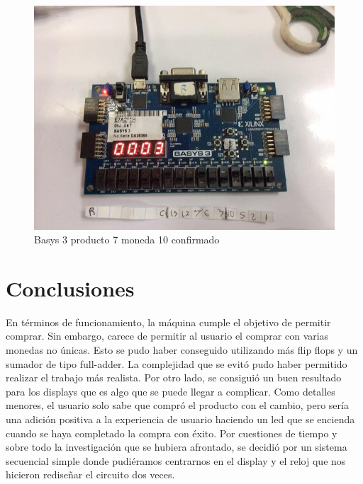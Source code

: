 \documentclass[12pt]{article}  %
\begin{document}
\newpage

\begin{figure}[!ht]
  \centering
  \caption{Basys 3 producto 7 moneda 10 confirmado}
  \includegraphics[width=0.75\linewidth]{Imagenes/Basys/product7-coin10-change.png}
\end{figure}

\section{Conclusiones}
En términos de funcionamiento, la máquina cumple el objetivo de permitir comprar. Sin embargo, carece de permitir al usuario el comprar con varias monedas no únicas. Esto se pudo haber conseguido utilizando más flip flops y un sumador de tipo full-adder. La complejidad que se evitó pudo haber permitido realizar el trabajo más realista. Por otro lado, se consiguió un buen resultado para los displays que es algo que se puede llegar a complicar. Como detalles menores, el usuario solo sabe que compró el producto con el cambio, pero sería una adición positiva a la experiencia de usuario haciendo un led que se encienda cuando se haya completado la compra con éxito. Por cuestiones de tiempo y sobre todo la investigación que se hubiera afrontado, se decidió por un sistema secuencial simple donde pudiéramos centrarnos en el display y el reloj que nos hicieron rediseñar el circuito dos veces.

\newpage %
\appendix %


\clearpage %
\end{document}
